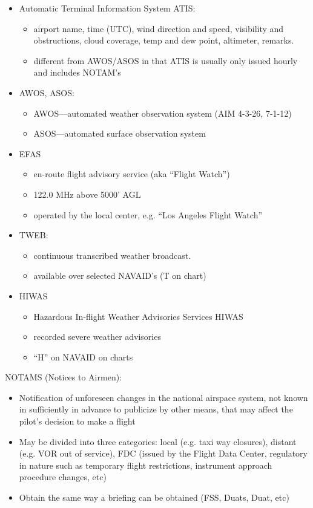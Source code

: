 \documentclass[twoside,openright]{report}
\begin{document}
\begin{itemize}
  \item Automatic Terminal Information System ATIS:
    \begin{itemize}
      \item airport name, time (UTC), wind direction and speed, visibility and
        obstructions, cloud coverage, temp and dew point, altimeter, remarks.
      \item different from AWOS/ASOS in that ATIS is usually only issued hourly
        and includes NOTAM's
    \end{itemize}
  \item AWOS, ASOS:
    \begin{itemize}
      \item AWOS—automated weather observation system (AIM 4-3-26, 7-1-12)
      \item ASOS—automated surface observation system
    \end{itemize}
  \item EFAS
    \begin{itemize}
      \item en-route flight advisory service (aka ``Flight Watch'')
      \item 122.0 MHz above 5000' AGL
      \item operated by the local center, e.g. ``Los Angeles Flight Watch''
    \end{itemize}
  \item TWEB:
    \begin{itemize}
      \item continuous transcribed weather broadcast.
      \item available over selected NAVAID's (T on chart)
    \end{itemize}
  \item HIWAS
    \begin{itemize}
      \item Hazardous In-flight Weather Advisories Services HIWAS
      \item recorded severe weather advisories
      \item ``H'' on NAVAID on charts
    \end{itemize}
\end{itemize}

NOTAMS (Notices to Airmen):

\begin{itemize}
  \item Notification of unforeseen changes in the national airspace system, not
    known in sufficiently in advance to publicize by other means, that may
    affect the pilot’s decision to make a flight

  \item May be divided into three categories: local (e.g. taxi way closures),
    distant (e.g. VOR out of service), FDC (issued by the Flight Data Center,
    regulatory in nature such as temporary flight restrictions, instrument
    approach procedure changes, etc)

  \item Obtain the same way a briefing can be obtained (FSS, Duats, Duat, etc)
\end{itemize}
\end{document}
